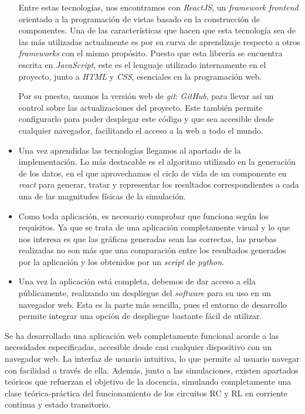 \documentclass[../main.tex]{subfiles}
\begin{document}
\begin{itemize}
    Entre estas tecnologías, nos encontramos con \textit{ReactJS}, un \textit{framework} \textit{frontend} orientado a la programación de vistas basado en la construcción de componentes. Una de las características que hacen que esta tecnología sea de las más utilizadas actualmente es por su curva de aprendizaje respecto a otros \textit{frameworks} con el mismo propósito. Puesto que esta librería se encuentra escrita en \textit{JavaScript}, este es el lenguaje utilizado internamente en el proyecto, junto a \textit{HTML} y \textit{CSS}, esenciales en la programación web.

    Por su puesto, usamos la versión web de \textit{git}: \textit{GitHub}, para llevar así un control sobre las actualizaciones del proyecto. Este también permite configurarlo para poder desplegar este código y que sea accesible desde cualquier navegador, facilitando el acceso a la web a todo el mundo. 
    
    \item Una vez aprendidas las tecnologías llegamos al apartado de la implementación. Lo más destacable es el algoritmo utilizado en la generación de los datos, en el que aprovechamos el ciclo de vida de un componente en \textit{react} para generar, tratar y representar los resultados correspondientes a cada una de las magnitudes físicas de la simulación.
    
    \item Como toda aplicación, es necesario comprobar que funciona según los requisitos. Ya que se trata de una aplicación completamente visual y lo que nos interesa es que las gráficas generadas sean las correctas, las pruebas realizadas no son más que una comparación entre los resultados generados por la aplicación y los obtenidos por un \textit{script} de \textit{python}. 
    
    
    \item Una vez la aplicación está completa, debemos de dar acceso a ella públicamente, realizando un despliegue del \textit{software} para su uso en un navegador web. Esta es la parte más sencilla, pues el entorno de desarrollo permite integrar una opción de despliegue bastante fácil de utilizar.
    
\end{itemize}

Se ha desarrollado una aplicación web completamente funcional acorde a las necesidades especificadas, accesible desde casi cualquier dispositivo con un navegador web. La interfaz de usuario intuitiva, lo que permite al usuario navegar con facilidad a través de ella. Además, junto a las simulaciones, existen apartados teóricos que refuerzan el objetivo de la docencia, simulando completamente una clase teórica-práctica del funcionamiento de los circuitos RC y RL en corriente continua y estado transitorio.
\end{document}
